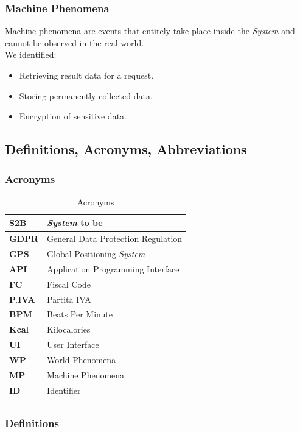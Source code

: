 \documentclass[titlepage]{article}
\begin{document}
		\subsubsection{Machine Phenomena}
		Machine phenomena are events that entirely take place inside the {\it System} and cannot be observed in the real world.\\
We identified:
		\begin{itemize}
			\item Retrieving result data for a request.
			\item Storing permanently collected data.
			\item Encryption of sensitive data.
		\end{itemize}

	\subsection{Definitions, Acronyms, Abbreviations}
		
		\subsubsection{Acronyms}
	
		\begin{longtable}{| p{2 cm} | p{7 cm} |} \hline
			{\bf S2B} & {\it System} to be \\\hline
			{\bf GDPR} & General Data Protection Regulation \\ \hline
			{\bf GPS} & Global Positioning {\it System} \\ \hline
			{\bf API} & Application Programming Interface \\ \hline
			{\bf FC} & Fiscal Code \\ \hline
			{\bf P.IVA} & Partita IVA \\ \hline
			{\bf BPM} & Beats Per Minute \\ \hline
			{\bf Kcal} & Kilocalories \\ \hline
			{\bf UI} & User Interface \\ \hline
			{\bf WP} & World Phenomena \\ \hline
			{\bf MP} & Machine Phenomena \\ \hline
			{\bf ID} & Identifier \\ \hline
				
			\caption{Acronyms}	
						
		\end{longtable}
			
		\subsubsection{Definitions}
			
\end{document}
